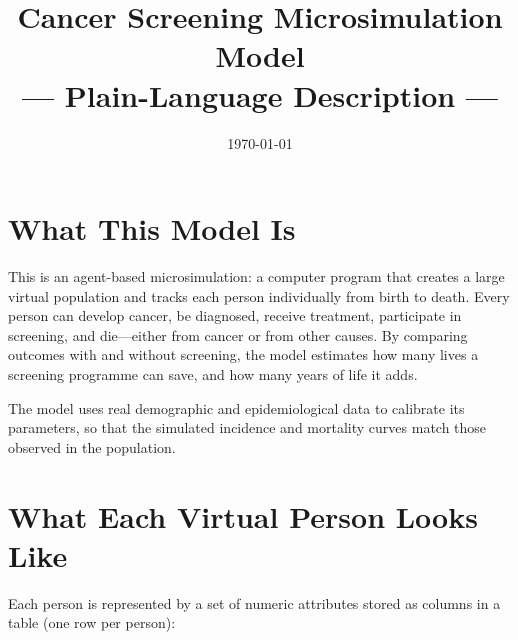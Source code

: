 \documentclass[12pt,a4paper]{article}
\title{Cancer Screening Microsimulation Model\\--- Plain-Language Description ---}
\author{}
\date{\today}
\begin{document}
\maketitle

\section{What This Model Is}

This is an agent-based microsimulation: a computer program that creates a large virtual population and tracks each person individually from birth to death. Every person can develop cancer, be diagnosed, receive treatment, participate in screening, and die---either from cancer or from other causes. By comparing outcomes with and without screening, the model estimates how many lives a screening programme can save, and how many years of life it adds.

The model uses real demographic and epidemiological data to calibrate its parameters, so that the simulated incidence and mortality curves match those observed in the population.

\section{What Each Virtual Person Looks Like}

Each person is represented by a set of numeric attributes stored as columns in a table (one row per person):
\end{document}
